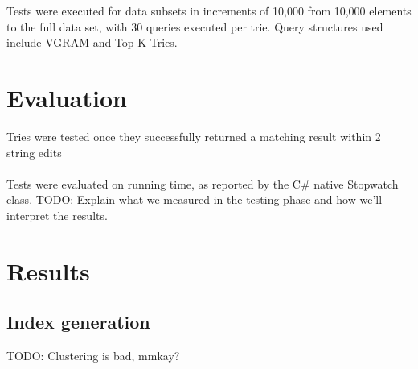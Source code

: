 \documentclass[pdftex,12pt,letter]{article}
\begin{document}
Tests were executed for data subsets in increments of 10,000 from 10,000 elements to the full data set, with 30 queries executed per trie. Query structures used include VGRAM and Top-K Tries.

\section{Evaluation}
Tries were tested once they successfully returned a matching result within 2 string edits\\
\\
Tests were evaluated on running time, as reported by the C\# native Stopwatch class. 
TODO: Explain what we measured in the testing phase and how we'll interpret the results.

\newpage
\section{Results}
\subsection{Index generation}

TODO: Clustering is bad, mmkay?
\end{document}
